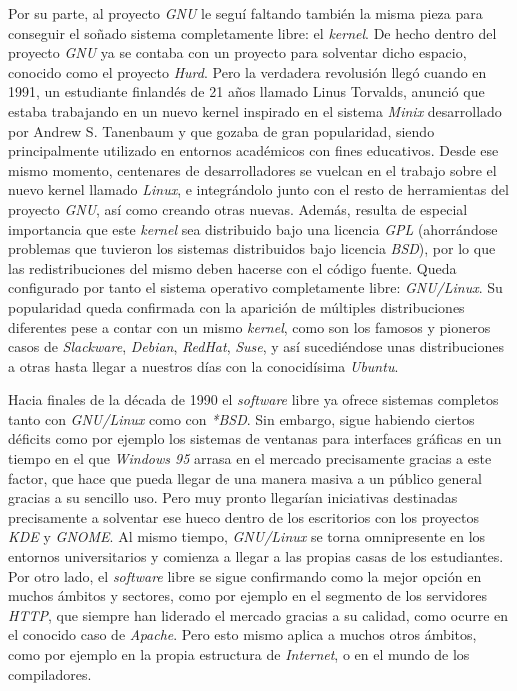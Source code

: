 Por su parte, al proyecto \textit{GNU} le seguí faltando también la misma pieza
para conseguir el soñado sistema completamente libre: el \textit{kernel}. De
hecho dentro del proyecto \textit{GNU} ya se contaba con un proyecto para
solventar dicho espacio, conocido como el proyecto \textit{Hurd}. Pero la
verdadera revolusión llegó cuando en 1991, un estudiante finlandés de 21 años
llamado Linus Torvalds, anunció que estaba trabajando en un nuevo kernel
inspirado en el sistema \textit{Minix} desarrollado por Andrew S. Tanenbaum y
que gozaba de gran popularidad, siendo principalmente utilizado en entornos
académicos con fines educativos. Desde ese mismo momento, centenares de
desarrolladores se vuelcan en el trabajo sobre el nuevo kernel llamado
\textit{Linux}, e integrándolo junto con el resto de herramientas del proyecto
\textit{GNU}, así como creando otras nuevas. Además, resulta de especial
importancia que este \textit{kernel} sea distribuido bajo una licencia
\textit{GPL} (ahorrándose problemas que tuvieron los sistemas distribuidos bajo
licencia \textit{BSD}), por lo que las redistribuciones del mismo deben hacerse
con el código fuente. Queda configurado por tanto el sistema operativo
completamente libre: \textit{GNU/Linux}. Su popularidad queda confirmada con la
aparición de múltiples distribuciones diferentes pese a contar con un mismo
\textit{kernel}, como son los famosos y pioneros casos de \textit{Slackware},
\textit{Debian}, \textit{RedHat}, \textit{Suse}, y así sucediéndose unas
distribuciones a otras hasta llegar a nuestros días con la conocidísima
\textit{Ubuntu}.

Hacia finales de la década de 1990 el \textit{software} libre ya ofrece sistemas
completos tanto con \textit{GNU/Linux} como con \textit{*BSD}. Sin embargo,
sigue habiendo ciertos déficits como por ejemplo los sistemas de ventanas para
interfaces gráficas en un tiempo en el que \textit{Windows 95} arrasa en el
mercado precisamente gracias a este factor, que hace que pueda llegar de una
manera masiva a un público general gracias a su sencillo uso. Pero muy pronto
llegarían iniciativas destinadas precisamente a solventar ese hueco dentro de
los escritorios con los proyectos \textit{KDE} y \textit{GNOME}. Al mismo
tiempo, \textit{GNU/Linux} se torna omnipresente en los entornos universitarios
y comienza a llegar a las propias casas de los estudiantes. Por otro lado, el
\textit{software} libre se sigue confirmando como la mejor opción en muchos
ámbitos y sectores, como por ejemplo en el segmento de los servidores
\textit{HTTP}, que siempre han liderado el mercado gracias a su calidad, como
ocurre en el conocido caso de \textit{Apache}. Pero esto mismo aplica a muchos
otros ámbitos, como por ejemplo en la propia estructura de \textit{Internet}, o
en el mundo de los compiladores.

